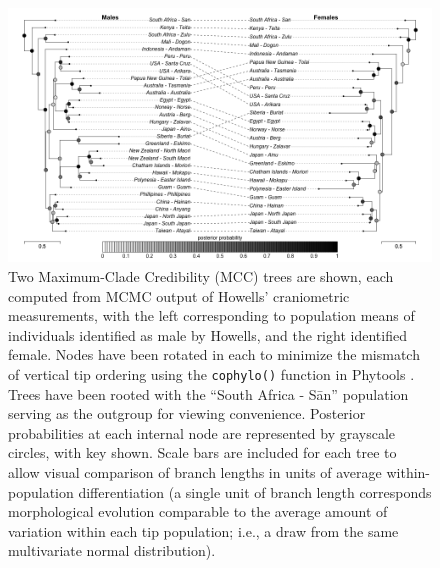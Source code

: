 \documentclass[10pt, twocolumn, twoside]{article}
\begin{document}
\begin{figure}[h]
\centering
\includegraphics[width=160mm]{figures/howellsTreesMF.png}
\caption[Maximum Clade Credibility Trees for Empirical Analyses of Howells' Data]{Two Maximum-Clade Credibility (MCC) trees are shown, each computed from MCMC output of Howells’ craniometric measurements, with the left corresponding to population means of individuals identified as male by Howells, and the right identified female. Nodes have been rotated in each to minimize the mismatch of vertical tip ordering using the \texttt{cophylo()} function in Phytools \citep{revellPhytoolsPackagePhylogenetic2012}. Trees have been rooted with the “South Africa - Sān” population serving as the outgroup for viewing convenience. Posterior probabilities at each internal node are represented by grayscale circles, with key shown. Scale bars are included for each tree to allow visual comparison of branch lengths in units of average within-population differentiation (a single unit of branch length corresponds morphological evolution comparable to the average amount of variation within each tip population; i.e., a draw from the same multivariate normal distribution).
\label{overflow}
\label{fig:mccCophylo}
}
\end{figure}
\end{document}
